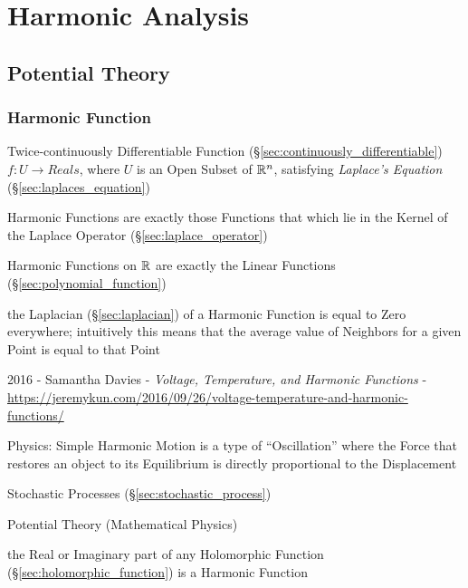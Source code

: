 \section{Harmonic Analysis}\label{sec:harmonic_analysis}

\subsection{Potential Theory}\label{sec:potential_theory}

\subsubsection{Harmonic Function}\label{sec:harmonic_function}

Twice-continuously Differentiable Function
(\S\ref{sec:continuously_differentiable}) $f : U \rightarrow Reals$,
where $U$ is an Open Subset of $\mathbb{R}^n$, satisfying \emph{Laplace's
  Equation} (\S\ref{sec:laplaces_equation})

Harmonic Functions are exactly those Functions that which lie in the Kernel of
the Laplace Operator (\S\ref{sec:laplace_operator})

Harmonic Functions on $\mathbb{R}$ are exactly the Linear Functions
(\S\ref{sec:polynomial_function})

the Laplacian (\S\ref{sec:laplacian}) of a Harmonic Function is equal to Zero
everywhere; intuitively this means that the average value of Neighbors for a
given Point is equal to that Point

2016 - Samantha Davies - \emph{Voltage, Temperature, and Harmonic
  Functions} -
\url{https://jeremykun.com/2016/09/26/voltage-temperature-and-harmonic-functions/}

Physics: Simple Harmonic Motion is a type of ``Oscillation'' where the
Force that restores an object to its Equilibrium is directly
proportional to the Displacement

Stochastic Processes (\S\ref{sec:stochastic_process})

Potential Theory (Mathematical Physics) %

the Real or Imaginary part of any Holomorphic Function
(\S\ref{sec:holomorphic_function}) is a Harmonic Function


